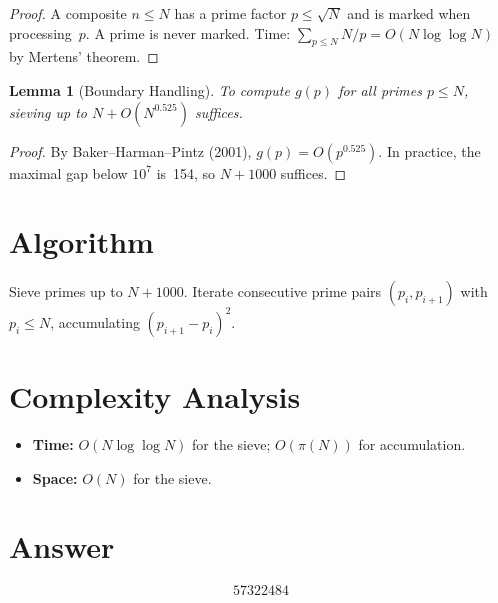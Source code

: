 \documentclass[11pt]{article}
\newtheorem{lemma}[theorem]{Lemma}
\theoremstyle{definition}
\begin{document}
\begin{proof}
A composite $n \leq N$ has a prime factor $p \leq \sqrt{N}$ and is marked when processing~$p$. A prime is never marked. Time: $\sum_{p \leq N} N/p = O(N\log\log N)$ by Mertens' theorem.
\end{proof}

\begin{lemma}[Boundary Handling]
To compute $g(p)$ for all primes $p \leq N$, sieving up to $N + O(N^{0.525})$ suffices.
\end{lemma}

\begin{proof}
By Baker--Harman--Pintz (2001), $g(p) = O(p^{0.525})$. In practice, the maximal gap below $10^7$ is~154, so $N + 1000$ suffices.
\end{proof}

\section{Algorithm}

Sieve primes up to $N + 1000$. Iterate consecutive prime pairs $(p_i, p_{i+1})$ with $p_i \leq N$, accumulating $(p_{i+1} - p_i)^2$.

\section{Complexity Analysis}

\begin{itemize}
    \item \textbf{Time:} $O(N\log\log N)$ for the sieve; $O(\pi(N))$ for accumulation.
    \item \textbf{Space:} $O(N)$ for the sieve.
\end{itemize}

\section{Answer}

\[
\boxed{57322484}
\]
\end{document}
